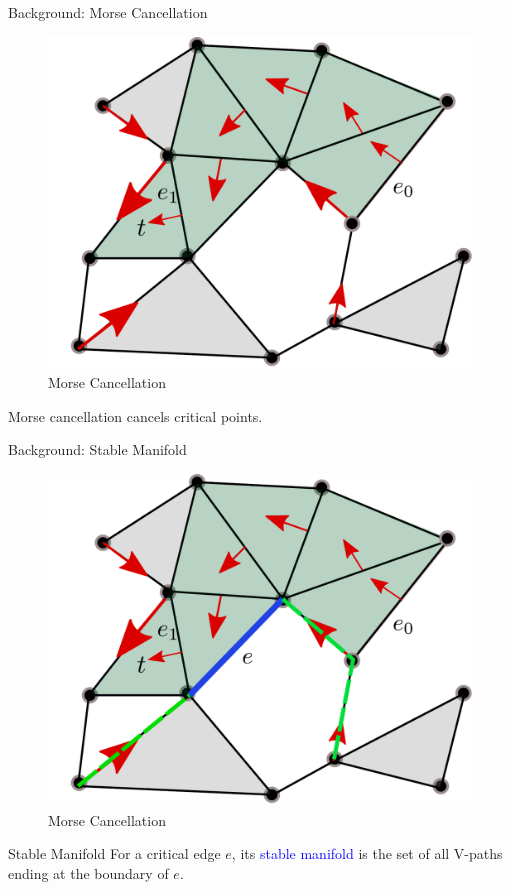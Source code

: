 \documentclass[9pt,sans-serif]{beamer}
\begin{document}
\begin{frame}{Background: Morse Cancellation}
  \begin{figure}[htb]
    \centering \includegraphics[scale=0.3]{cancellation}
    \caption{Morse Cancellation}
  \end{figure}

  \begin{block}{}
    Morse cancellation cancels critical points.
  \end{block}
\end{frame}

\begin{frame}{Background: Stable Manifold}
  \begin{figure}[htb]
    \centering \includegraphics[scale=0.3]{stable}
    \caption{Morse Cancellation}
  \end{figure}

  \begin{block}{Stable Manifold}
    For a critical edge $e$, its \textcolor{blue}{stable manifold} is the set of
    all V-paths ending at the boundary of $e$.
  \end{block}
\end{frame}
\end{document}
